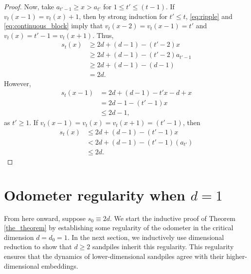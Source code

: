 \documentclass[12pt]{amsart}
\begin{document}
\begin{proof}
		Now, take  $a_{t'-1} \geq x > a_{t'}$ for  $1 \leq t' \leq (t-1)$. If $v_{t}(x-1) = v_{t}(x) + 1$, then by strong induction for $t'\leq t$,
		\eqref{eq:ripple} and \eqref{eq:continuous_block} imply that  $v_{t}(x-2) = v_{t}(x-1) = t'$ and $v_{t}(x) = t'-1 = v_{t}(x+1)$.  Thus, 
		\begin{align*}
		s_t(x) &\geq 2d + (d-1) - (t' - 2) x  \\
		&\geq  2d + (d-1) - (t'-2) a_{t'-1} \\
		&\geq 2d + (d-1) - (d-1)  \\
		&= 2d.
		\end{align*}
		However,  
		\begin{align*}
		s_t(x-1) &= 2 d + (d-1) - t'x - d + x \\
		&= 2 d -1 - (t'-1) x \\
		&\leq 2 d -1,
		\end{align*}
		as $t' \geq 1$.
		If $v_{t}(x-1) = v_{t}(x) = v_{t}(x+1) = (t'-1)$, then
		\begin{align*}
		s_t(x) &\leq 2 d + (d-1) - (t'-1) x  \\
		&< 2 d + (d-1) - (t'-1) (a_{t'}) \\
		&\leq 2d.
		\end{align*} 
		
		
		
		
		
		
		
		
	\end{proof}
	
	
	
	\section{Odometer regularity when \texorpdfstring{$d = 1$}{d=1}} \label{sec:base_regularity}
		From here onward, suppose $s_0 \equiv 2 d$. We start the inductive proof of Theorem \ref{the_theorem} by establishing some regularity of the odometer in the critical dimension $d=d_0=1$.   In the next section, we inductively use dimensional reduction to show that $d \geq 2$ sandpiles inherit this regularity. This regularity ensures that the dynamics of lower-dimensional sandpiles agree with their higher-dimensional embeddings. 
		
\end{document}
